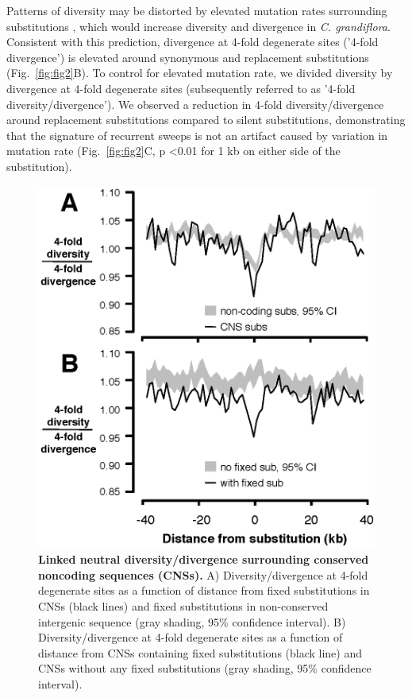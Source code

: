 Patterns of diversity may be distorted by elevated mutation rates surrounding substitutions \citep{Sattath2011-ns}, which would increase diversity and divergence in \textit{C. grandiflora}. Consistent with this prediction, divergence at 4-fold degenerate sites ('4-fold divergence') is elevated around synonymous and replacement substitutions (Fig.~\ref{fig:fig2}B). To control for elevated mutation rate, we divided diversity by divergence at 4-fold degenerate sites (subsequently referred to as '4-fold diversity/divergence'). We observed a reduction in 4-fold diversity/divergence around replacement substitutions compared to silent substitutions, demonstrating that the signature of recurrent sweeps is not an artifact caused by variation in mutation rate (Fig.~\ref{fig:fig2}C, p \textless  0.01 for 1 kb on either side of the substitution).

\begin{figure}[ht!]
      \centering
       \includegraphics{Ch2Fig3}
    \caption{\textbf{Linked neutral diversity/divergence surrounding conserved noncoding sequences (CNSs).} A) Diversity/divergence at 4-fold degenerate sites as a function of distance from fixed substitutions in CNSs (black lines) and fixed substitutions in non-conserved intergenic sequence (gray shading, 95\% confidence interval). B) Diversity/divergence at 4-fold degenerate sites as a function of distance from CNSs containing fixed substitutions (black line) and CNSs without any fixed substitutions (gray shading, 95\% confidence interval).}
    \label{fig:fig3}
\end{figure}

